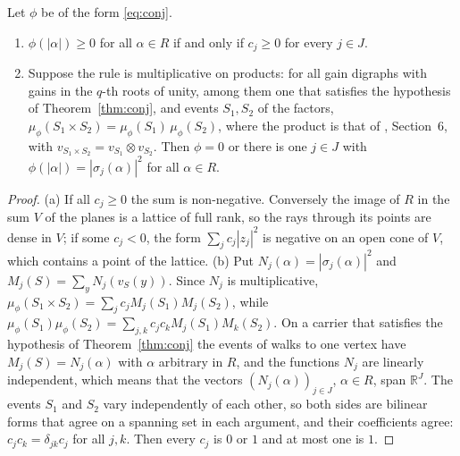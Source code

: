 \begin{proposition}\label{prop:compo}
Let $\phi$ be of the form \eqref{eq:conj}.
\begin{enumerate}[label=(\alph*)]
\item $\phi(|\alpha|)\ge0$ for all $\alpha\in R$ if and only if $c_j\ge0$ for every $j\in J$.
\item Suppose the rule is multiplicative on products: for all gain digraphs with gains in the $q$-th roots of unity, among them one that satisfies the hypothesis of Theorem~\ref{thm:conj}, and events $S_1,S_2$ of the factors, $\mu_\phi(S_1\times S_2)=\mu_\phi(S_1)\,\mu_\phi(S_2)$, where the product is that of \cite{g8}, Section~6, with $v_{S_1\times S_2}=v_{S_1}\otimes v_{S_2}$. Then $\phi=0$ or there is one $j\in J$ with $\phi(|\alpha|)=|\sigma_j(\alpha)|^2$ for all $\alpha\in R$.
\end{enumerate}
\end{proposition}
\begin{proof}
(a) If all $c_j\ge0$ the sum is non-negative. Conversely the image of $R$ in the sum $V$ of the planes is a lattice of full rank, so the rays through its points are dense in $V$; if some $c_j<0$, the form $\sum_jc_j|z_j|^2$ is negative on an open cone of $V$, which contains a point of the lattice. (b) Put $N_j(\alpha)=|\sigma_j(\alpha)|^2$ and $M_j(S)=\sum_yN_j(v_S(y))$. Since $N_j$ is multiplicative, $\mu_\phi(S_1\times S_2)=\sum_jc_jM_j(S_1)M_j(S_2)$, while $\mu_\phi(S_1)\mu_\phi(S_2)=\sum_{j,k}c_jc_kM_j(S_1)M_k(S_2)$. On a carrier that satisfies the hypothesis of Theorem~\ref{thm:conj} the events of walks to one vertex have $M_j(S)=N_j(\alpha)$ with $\alpha$ arbitrary in $R$, and the functions $N_j$ are linearly independent, which means that the vectors $(N_j(\alpha))_{j\in J}$, $\alpha\in R$, span $\mathbb{R}^J$. The events $S_1$ and $S_2$ vary independently of each other, so both sides are bilinear forms that agree on a spanning set in each argument, and their coefficients agree: $c_jc_k=\delta_{jk}c_j$ for all $j,k$. Then every $c_j$ is $0$ or $1$ and at most one is $1$.
\end{proof}

